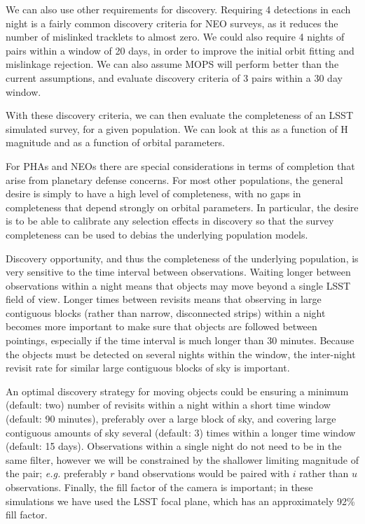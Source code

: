 We can also use other requirements for discovery. Requiring 4
detections in each night is a fairly common discovery criteria for
NEO surveys, as it reduces the number of mislinked tracklets to almost
zero. We could also require 4 nights of pairs within a window of 20 days, in order to improve the
initial orbit fitting and mislinkage rejection. We can also assume
MOPS will perform better than the current assumptions, and evaluate
discovery criteria of 3 pairs within a 30 day window.

With these discovery criteria, we can then evaluate the completeness
of an LSST simulated survey, for a given population. We can look at
this as a function of H magnitude and as a function of orbital
parameters.

For PHAs and NEOs there are special considerations in terms of
completion that arise from planetary defense concerns. For most other
populations, the general desire is simply to have a high level of
completeness, with no gaps in completeness that depend strongly on
orbital parameters. In particular, the desire is to be able to
calibrate any selection effects in discovery so that the survey completeness can
be used to debias the underlying population models.

Discovery opportunity, and thus the completeness of the underlying
population, is very sensitive to the time interval between
observations. Waiting longer between observations within a night means that objects
may move beyond a single LSST field of view. Longer times between
revisits means that observing in large contiguous blocks (rather than
narrow, disconnected strips) within a night becomes more important to make sure that
objects are followed between pointings, especially if the time
interval is much longer than 30 minutes. Because the objects must be
detected on several nights within the window, the inter-night revisit
rate for similar large contiguous blocks of sky is important.

An optimal discovery strategy for moving
objects could be ensuring a minimum (default: two) number of revisits
within a night within a short time window (default: 90 minutes),
preferably over a large block of sky, and
covering large contiguous amounts of sky several (default: 3) times within a
longer time window (default: 15 days).  Observations within a single
night do not need to be in the same filter, however we will be
constrained by the shallower limiting magnitude of the pair; {\it e.g.}
preferably $r$ band observations would be paired with $i$ rather than
$u$ observations. Finally, the fill factor of the camera is important;
in these simulations we have used the LSST focal plane, which has an
approximately 92\% fill factor.

